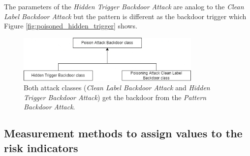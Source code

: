 The parameters of the \textit{Hidden Trigger Backdoor Attack} are analog to the \textit{Clean Label Backdoor Attack} but the pattern is different as the backdoor trigger which Figure \ref{fig:poisoned_hidden_trigger} shows.

\begin{figure}[ht!]
  \centering
  \includegraphics[width=9cm]{pictures/attack_relationship.png}
  \caption{Both attack classes (\textit{Clean Label Backdoor Attack} and \textit{Hidden Trigger Backdoor Attack}) get the backdoor from the \textit{Pattern Backdoor Attack}.}
  \label{fig:attack_relationship}
\end{figure}

\subsection{Measurement methods to assign values to the risk indicators}

